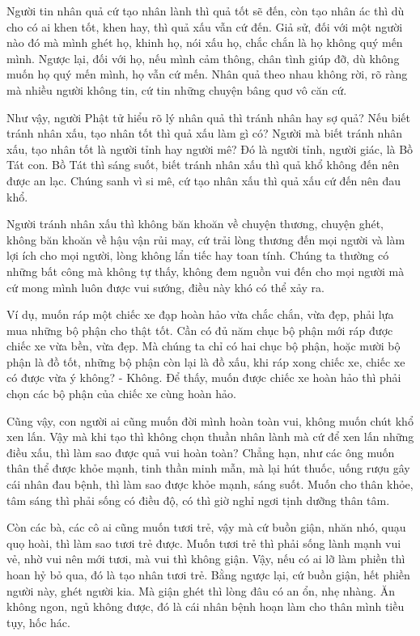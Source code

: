 \documentclass[
  12pt,
  oneside]{book}
\begin{document}
Người tin nhân quả cứ tạo nhân lành thì quả tốt sẽ đến, còn tạo nhân ác thì dù cho có ai khen tốt, khen hay, thì quả xấu vẫn cứ đến. Giả sử, đối với một người nào đó mà mình ghét họ, khinh họ, nói xấu họ, chắc chắn là họ không quý mến mình. Ngược lại, đối với họ, nếu mình cảm thông, chân tình giúp đỡ, dù không muốn họ quý mến mình, họ vẫn cứ mến. Nhân quả theo nhau không rời, rõ ràng mà nhiều người không tin, cứ tin những chuyện bâng quơ vô căn cứ.

Như vậy, người Phật tử hiểu rõ lý nhân quả thì tránh nhân hay sợ quả? Nếu biết tránh nhân xấu, tạo nhân tốt thì quả xấu làm gì có? Người mà biết tránh nhân xấu, tạo nhân tốt là người tỉnh hay người mê? Đó là người tỉnh, người giác, là Bồ Tát con. Bồ Tát thì sáng suốt, biết tránh nhân xấu thì quả khổ không đến nên được an lạc. Chúng sanh vì si mê, cứ tạo nhân xấu thì quả xấu cứ đến nên đau khổ.

Người tránh nhân xấu thì không băn khoăn về chuyện thương, chuyện ghét, không băn khoăn về hậu vận rủi may, cứ trải lòng thương đến mọi người và làm lợi ích cho mọi người, lòng không lẩn tiếc hay toan tính. Chúng ta thường có những bất công mà không tự thấy, không đem nguồn vui đến cho mọi người mà cứ mong mình luôn được vui sướng, điều này khó có thể xảy ra.

Ví dụ, muốn ráp một chiếc xe đạp hoàn hảo vừa chắc chắn, vừa đẹp, phải lựa mua những bộ phận cho thật tốt. Cần có đủ năm chục bộ phận mới ráp được chiếc xe vừa bền, vừa đẹp. Mà chúng ta chỉ có hai chục bộ phận, hoặc mười bộ phận là đồ tốt, những bộ phận còn lại là đồ xấu, khi ráp xong chiếc xe, chiếc xe có được vừa ý không? - Không. Để thấy, muốn được chiếc xe hoàn hảo thì phải chọn các bộ phận của chiếc xe cùng hoàn hảo.

Cũng vậy, con người ai cũng muốn đời mình hoàn toàn vui, không muốn chút khổ xen lấn. Vậy mà khi tạo thì không chọn thuần nhân lành mà cứ để xen lấn những điều xấu, thì làm sao được quả vui hoàn toàn? Chẳng hạn, như các ông muốn thân thể được khỏe mạnh, tinh thần minh mẫn, mà lại hút thuốc, uống rượu gây cái nhân đau bệnh, thì làm sao được khỏe mạnh, sáng suốt. Muốn cho thân khỏe, tâm sáng thì phải sống có điều độ, có thì giờ nghỉ ngơi tịnh dưỡng thân tâm.

Còn các bà, các cô ai cũng muốn tươi trẻ, vậy mà cứ buồn giận, nhăn nhó, quạu quọ hoài, thì làm sao tươi trẻ được. Muốn tươi trẻ thì phải sống lành mạnh vui vẻ, nhờ vui nên mới tươi, mà vui thì không giận. Vậy, nếu có ai lỡ làm phiền thì hoan hỷ bỏ qua, đó là tạo nhân tươi trẻ. Bằng ngược lại, cứ buồn giận, hết phiền người này, ghét người kia. Mà giận ghét thì lòng đâu có an ổn, nhẹ nhàng. Ăn không ngon, ngủ không được, đó là cái nhân bệnh hoạn làm cho thân mình tiều tụy, hốc hác.
\end{document}
